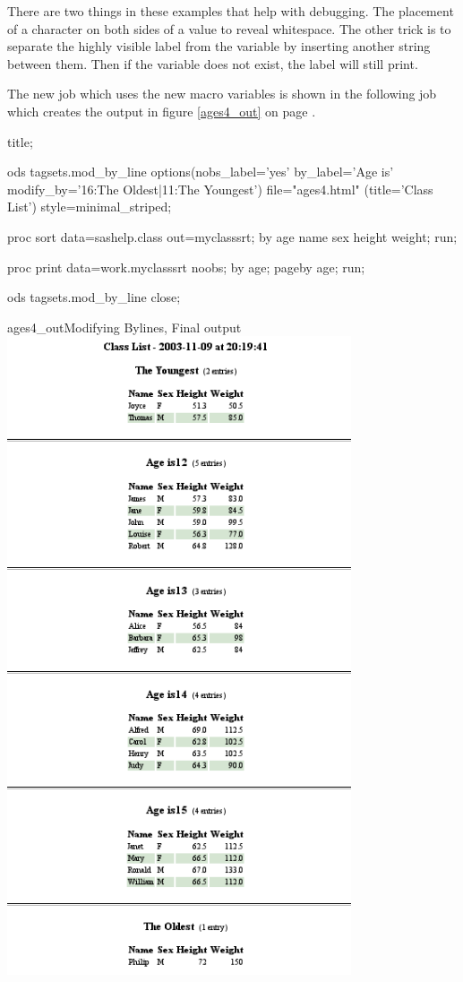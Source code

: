 There are two things in these examples that help with debugging.  The placement
of a character on both sides of a value to reveal whitespace.  The other trick
is to separate the highly visible label from the variable by inserting another
string between them.  Then if the variable does not exist, the label will still
print.

The new job which uses the new macro variables is shown in the following job 
which creates the output in figure \ref{ages4_out} on page \pageref{ages4_out}.

\begin{sfvcode}
title;

ods tagsets.mod_by_line 
    options(nobs_label='yes' 
            by_label='Age is' 
            modify_by='16:The Oldest|11:The Youngest')
    file="ages4.html" (title='Class List')
    style=minimal_striped;

proc sort data=sashelp.class out=myclasssrt;
  by age name sex height weight;
run;

proc print data=work.myclasssrt noobs;
    by age;
    pageby age;
run;

ods tagsets.mod_by_line close;
\end{sfvcode}

\begin{goutput}{ages4_out}{Modifying Bylines, Final output}
\includegraphics[width=4in]{ages4.png}
\end{goutput}


